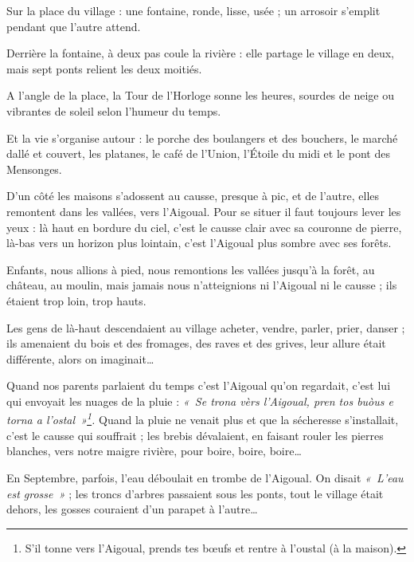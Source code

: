 


Sur la place du village : une fontaine, ronde, lisse, usée ; un arrosoir s’emplit pendant que
l’autre attend.

Derrière la fontaine, à deux pas coule la rivière : elle partage le village en deux, mais sept
ponts relient les deux moitiés.

A l’angle de la place, la Tour de l’Horloge sonne les heures, sourdes de neige ou vibrantes de
soleil selon l’humeur du temps.

Et la vie s’organise autour : le porche des boulangers et des bouchers, le marché dallé et
couvert, les platanes, le café de l’Union, l’Étoile du midi et le pont des Mensonges.

D’un côté les maisons s’adossent au causse, presque à pic, et de l’autre, elles remontent dans
les vallées, vers l’Aigoual. Pour se situer il faut toujours lever les yeux : là haut en bordure du
ciel, c’est le causse clair avec sa couronne de pierre, là-bas vers un horizon plus lointain, c’est
l’Aigoual plus sombre avec ses forêts.

Enfants, nous allions à pied, nous remontions les vallées jusqu’à la forêt, au château, au
moulin, mais jamais nous n’atteignions ni l’Aigoual ni le causse ; ils étaient trop loin, trop
hauts.

Les gens de là-haut descendaient au village acheter, vendre, parler, prier, danser ; ils
amenaient du bois et des fromages, des raves et des grives, leur allure était différente, alors on
imaginait…

Quand nos parents parlaient du temps c’est l’Aigoual qu’on regardait, c’est lui qui envoyait
les nuages de la pluie : \textit{«~Se trona vèrs l'Aigoual, pren tos buòus e torna a l'ostal~»\footnote{S’il tonne vers l’Aigoual, prends tes bœufs et rentre à l’oustal (à la maison).}.}
Quand la pluie ne venait plus et que la sécheresse s’installait, c’est le causse qui souffrait ; les
brebis dévalaient, en faisant rouler les pierres blanches, vers notre maigre rivière, pour boire,
boire, boire…

En Septembre, parfois, l’eau déboulait en trombe de l’Aigoual. On disait \textit{«~L’eau est
grosse~»} ; les troncs d’arbres passaient sous les ponts, tout le village était dehors, les gosses
couraient d’un parapet à l’autre…


